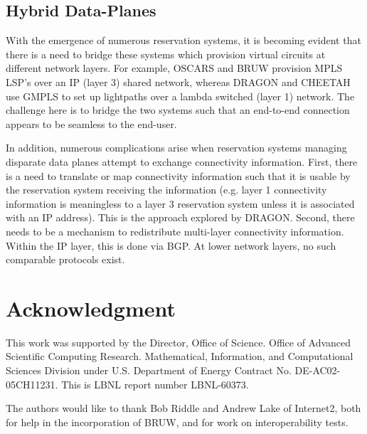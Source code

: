\documentclass[conference]{IEEEtran}
\begin{document}
\subsection{Hybrid Data-Planes}
With the emergence of numerous reservation systems, it is becoming evident 
that there is a need to bridge these systems which provision virtual circuits 
at different network layers.
For example, OSCARS and BRUW provision MPLS LSP's over an IP (layer 3) shared 
network, whereas DRAGON and CHEETAH use
GMPLS to set up lightpaths over a lambda switched (layer 1) network.
The challenge here is to bridge the two systems such
that an end-to-end connection appears to be seamless to the end-user.

In addition, numerous complications arise when reservation systems managing 
disparate data planes attempt to exchange connectivity information.  First, 
there is a need to translate or map connectivity information such that it is 
usable by the reservation system receiving the information (e.g. layer 1 
connectivity information is meaningless to a layer 3 reservation system unless 
it is associated with an IP address).  This is the approach explored by DRAGON.
Second, there needs to be a mechanism to redistribute multi-layer connectivity 
information. Within the IP layer, this is done via BGP.  At lower network 
layers, no such comparable protocols exist.

\section*{Acknowledgment}
This work was supported by the Director, Office of Science. Office of
Advanced Scientific Computing Research. Mathematical, Information, and
Computational Sciences Division under U.S. Department of
Energy Contract No. DE-AC02-05CH11231. This is LBNL report number LBNL-60373.

The authors would like to thank Bob Riddle and Andrew Lake of Internet2, both
for help in the incorporation of BRUW, and for work on interoperability tests.
\end{document}

